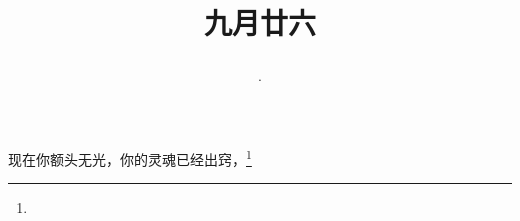 \title{\date[d=28,m=10,y=2024][year:cn-y,年,month:cn,day:cn,日,·,weekday]·九月廿六 }
现在你额头无光，你的灵魂已经出窍，\footnote{ }

